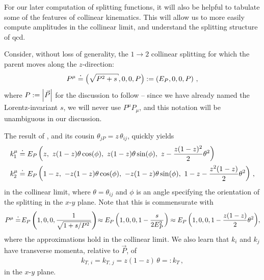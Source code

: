 For our later computation of splitting functions, it will also be helpful to tabulate some of the features of collinear kinematics.
%
This will allow us to more easily compute amplitudes in the collinear limit, and understand the splitting structure of \gls{qcd}.
\begin{example}
    \label{ex:collinear-kinematics}
    Consider, without loss of generality, the \(1 \to 2\) collinear splitting for which the parent moves along the \(z\)-direction:
    \begin{align}
        P^\mu
        \reppedby
        \le(\sqrt{P^2 + s}, 0, 0, P\ri)
        :=
        \le(E_P, 0, 0, P\ri)
        \,,
    \end{align}
    where \(P := \abs{\vec{P}}\) for the discussion to follow -- since we have already named the Lorentz-invariant \(s\), we will never use \(P^\mu P_\mu\), and this notation will be unambiguous in our discussion.

    The result of , and its cousin \(\theta_{jP} = z \, \theta_{ij}\), quickly yields
    \begin{align}
        k_1^\mu
        &\overset{\boldsymbol{\cdot}}{=}
        E_P \left(z, \,\, z(1-z)\theta \cos(\phi), \,\, z(1-z)\theta \sin(\phi), \,\, z - \frac{z(1-z)^2}{2}\theta^2\right)
        \\
        k_2^\mu
        &\overset{\boldsymbol{\cdot}}{=}
        E_P \left(1-z, \,\, -z(1-z)\theta \cos(\phi), \,\, -z(1-z)\theta \sin(\phi), \,\, 1-z - \frac{z^2(1-z)}{2}\theta^2\right)
        \,,
    \end{align}
    in the collinear limit, where \(\theta = \theta_{ij}\) and \(\phi\) is an angle specifying the orientation of the splitting in the \(x\)-\(y\) plane.
    Note that this is commensurate with
    \begin{align}
        P^\mu
        \reppedby
        \!
        E_P \le(1, 0, 0, \frac{1}{\sqrt{1 + s/P^2}}\ri)
        \!
        \approx
        E_P \le(1, 0, 0, 1 - \frac{s}{2 E_P^2}\ri)
        \approx
        E_P \le(1, 0, 0, 1 - \frac{z(1-z)}{2} \theta^2\ri)
        \!
        ,
    \end{align}
    where the approximations hold in the collinear limit.
    We also learn that \(k_i\) and \(k_j\) have transverse momenta, relative to \(\vec{P}\), of
    \begin{align}
        k_{T,\,i}
        =
        k_{T,\,j}
        =
        z(1-z)\, \theta
        =:
        k_T
        \,,
    \end{align}
    in the \(x\)-\(y\) plane.
\end{example}

